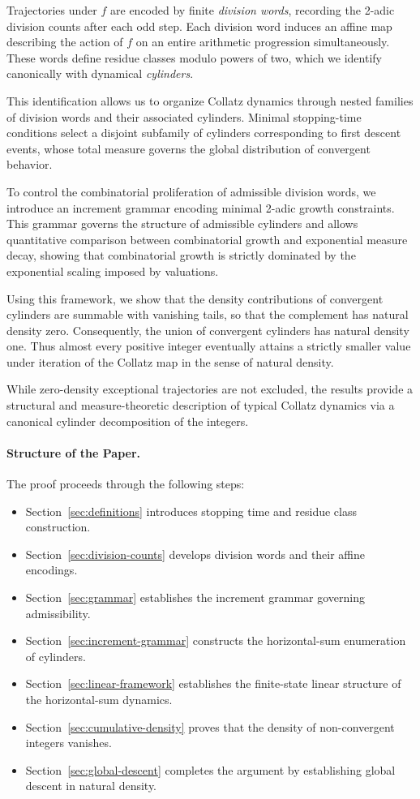 \documentclass[12pt, oneside]{article}   	%
\numberwithin{equation}{section}          %
\theoremstyle{definition}
\begin{document}
Trajectories under $f$ are encoded by finite \emph{division words}, recording the
2-adic division counts after each odd step. Each division word induces an affine map
describing the action of $f$ on an entire arithmetic progression simultaneously. These
words define residue classes modulo powers of two, which we identify canonically with
dynamical \emph{cylinders}.

This identification allows us to organize Collatz dynamics through nested families of
division words and their associated cylinders. Minimal stopping-time conditions select
a disjoint subfamily of cylinders corresponding to first descent events, whose total
measure governs the global distribution of convergent behavior.

To control the combinatorial proliferation of admissible division words, we introduce an
increment grammar encoding minimal 2-adic growth constraints. This grammar governs the
structure of admissible cylinders and allows quantitative comparison between
combinatorial growth and exponential measure decay, showing that combinatorial growth
is strictly dominated by the exponential scaling imposed by valuations.

Using this framework, we show that the density contributions of convergent cylinders
are summable with vanishing tails, so that the complement has natural density zero.
Consequently, the union of convergent cylinders has natural density one. Thus almost
every positive integer eventually attains a strictly smaller value under iteration of
the Collatz map in the sense of natural density.

While zero-density exceptional trajectories are not excluded, the results provide a
structural and measure-theoretic description of typical Collatz dynamics via a canonical
cylinder decomposition of the integers.

\paragraph{Structure of the Paper.}
The proof proceeds through the following steps:
\begin{itemize}
\item Section~\ref{sec:definitions} introduces stopping time and residue class construction.
\item Section~\ref{sec:division-counts} develops division words and their affine encodings.
\item Section~\ref{sec:grammar} establishes the increment grammar governing admissibility.
\item Section~\ref{sec:increment-grammar} constructs the horizontal-sum enumeration of cylinders.
\item Section~\ref{sec:linear-framework} establishes the finite-state linear structure of the horizontal-sum dynamics.
\item Section~\ref{sec:cumulative-density} proves that the density of non-convergent integers vanishes.
\item Section~\ref{sec:global-descent} completes the argument by establishing global descent in natural density.
\end{itemize}
\end{document}
